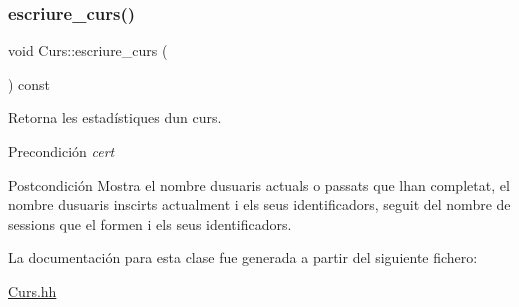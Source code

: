 \subsubsection{\texorpdfstring{escriure\+\_\+curs()}{escriure\_curs()}}
{\footnotesize\ttfamily void Curs\+::escriure\+\_\+curs (\begin{DoxyParamCaption}{ }\end{DoxyParamCaption}) const}



Retorna les estadístiques d\textquotesingle{}un curs. 

\begin{DoxyPrecond}{Precondición}
{\itshape cert} 
\end{DoxyPrecond}
\begin{DoxyPostcond}{Postcondición}
Mostra el nombre d\textquotesingle{}usuaris actuals o passats que l\textquotesingle{}han completat, el nombre d\textquotesingle{}usuaris inscirts actualment i els seus identificadors, seguit del nombre de sessions que el formen i els seus identificadors. 
\end{DoxyPostcond}


La documentación para esta clase fue generada a partir del siguiente fichero\+:\begin{DoxyCompactItemize}
\item 
\mbox{\hyperlink{_curs_8hh}{Curs.\+hh}}\end{DoxyCompactItemize}
